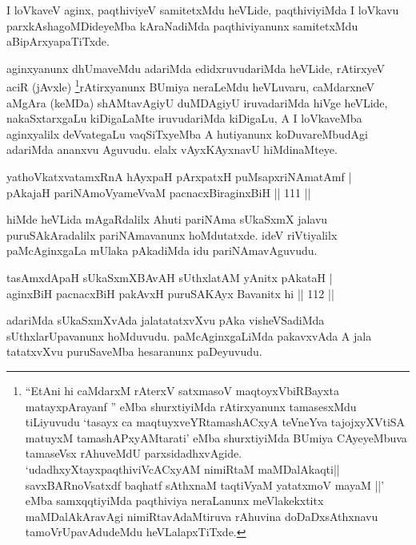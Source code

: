 \begin{artha}
I loVkaveV aginx, paqthiviyeV samitetxMdu heVLide, paqthiviyiMda I
loVkavu parxkAshagoMDideyeMba kAraNadiMda paqthiviyanunx samitetxMdu\break
aBipArxyapaTiTxde.
\end{artha}

\begin{artha}
aginxyanunx dhUmaveMdu adariMda edidxruvudariMda heVLide, rAtirxyeV
aciR (jAvxle) \footnote{``EtAni hi caMdarxM rAterxV satxmasoV maqtoyxVbiRBayxta matayxpArayanf '' eMba shurxtiyiMda rAtirxyanunx   tamasesxMdu tiLiyuvudu `tasayx ca maqtuyxveYRtamashACxyA teVneYva tajojxyXVtiSA matuyxM tamashAPxyAMtarati' eMba shurxtiyiMda BUmiya CAyeyeMbuva tamaseVsx rAhuveMdU parxsidadhxvAgide. \\`udadhxyXtayxpaqthiviVcACxyAM nimiRtaM maMDalAkaqti||\\ savxBARnoVsatxdf baqhatf sAthxnaM taqtiVyaM yatatxmoV mayaM ||' \\eMba samxqqtiyiMda paqthiviya neraLanunx meVlakekxtitx maMDalAkAravAgi nimiRtavAdaMtiruva rAhuvina doDaDxsAthxnavu tamoVrUpavAdudeMdu heVLalapxTiTxde.}rAtirxyanunx BUmiya neraLeMdu heVLuvaru,
caMdarxneV aMgAra (keMDa) shAMtavAgiyU duMDAgiyU iruvadariMda hiVge
heVLide, nakaSxtarxgaLu kiDigaLaMte iruvudariMda kiDigaLu, A I
loVkaveMba aginxyalilx deVvategaLu vaqSiTxyeMba A hutiyanunx
koDuvareMbudAgi adariMda ananxvu Aguvudu. elalx vAyxKAyxnavU
hiMdinaMteye.
\end{artha}

\begin{shl}
yathoVkatxvatamxRnA hAyxpaH pArxpatxH puMsapxriNAmatAmf | \\
pAkajaH pariNAmoV\s yameVvaM pacnacxBiraginxBiH \hfill|| 111 || 
\end{shl}

\begin{artha}
hiMde heVLida mAgaRdalilx Ahuti pariNAma sUkaSxmX jalavu
puruSAkAradalilx pariNAmavanunx hoMdutatxde. ideV riVtiyalilx
paMcAginxgaLa mUlaka pAkadiMda idu pariNAmavAguvudu.
\end{artha}


\begin{shl}
tasAmxdApaH sUkaSxmXBAvAH sUthxlatAM yAnitx pAkataH | \\
aginxBiH pacnacxBiH pakAvxH puruSAKAyx Bavanitx hi \hfill|| 112 || 
\end{shl}

\begin{artha}
adariMda sUkaSxmXvAda jalatatatxvXvu pAka visheVSadiMda
sUthxlarUpavanunx hoMduvudu. paMcAginxgaLiMda pakavxvAda A jala
tatatxvXvu puruSaveMba hesaranunx paDeyuvudu.
\end{artha}

